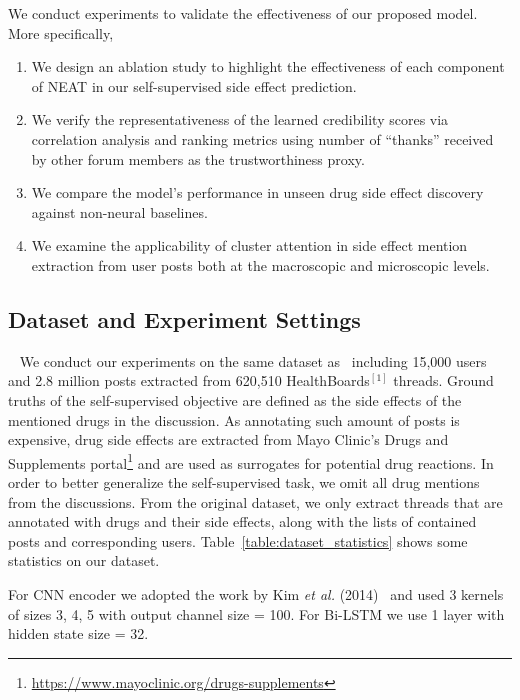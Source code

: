 \documentclass{bmcart}
\begin{document}
We conduct experiments to validate the effectiveness of our proposed model. More specifically,
\begin{enumerate}
    \item We design an ablation study to highlight the effectiveness of each component of NEAT in our self-supervised side effect prediction.
    \item We verify the representativeness of the learned credibility scores via correlation analysis and ranking metrics using number of ``thanks'' received by other forum members as the trustworthiness proxy.
    \item We compare the model's performance in unseen drug side effect discovery against non-neural baselines.
    \item We examine the applicability of cluster attention in side effect mention extraction from user posts both at the macroscopic and microscopic levels.
\end{enumerate}

\subsection{Dataset and Experiment Settings}~\label{subsec:dataset}
We conduct our experiments on the same dataset as~\cite{mukherjee2014people} including 15,000 users and 2.8 million posts extracted from 620,510 HealthBoards$^{[1]}$ threads. Ground truths of the self-supervised objective are defined as the side effects of the mentioned drugs in the discussion. As annotating such amount of posts is expensive, drug side effects are extracted from Mayo Clinic's Drugs and Supplements portal\footnote{\scriptsize{\url{https://www.mayoclinic.org/drugs-supplements}}} and are used as surrogates for potential drug reactions. In order to better generalize the self-supervised task, we omit all drug mentions from the discussions. From the original dataset, we only extract threads that are annotated with drugs and their side effects, along with the lists of contained posts and corresponding users. Table~\ref{table:dataset_statistics} shows 
some statistics on our dataset. 

For CNN encoder we adopted the work by Kim \textit{et al.} (2014)~\cite{kim2014convolutional} and used 3 kernels of sizes 3, 4, 5 with output channel size = 100. For Bi-LSTM we use 1 layer with hidden state size = 32.
\end{document}
